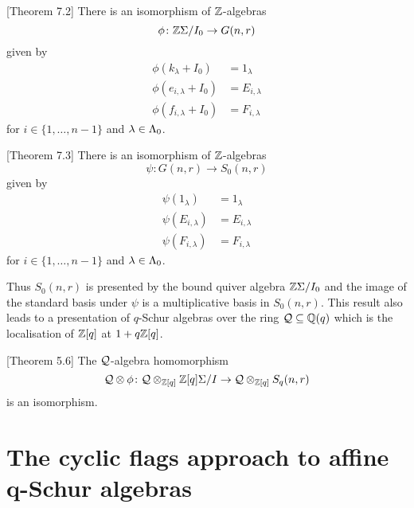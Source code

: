 \documentclass[a4paper, 11pt, twoside]{report}
\begin{document}
\begin{theorem*}\cite{su15}[Theorem 7.2]
There is an isomorphism of $\mathbb{Z}$-algebras
\begin{equation*}
\phi\colon\mathbb{Z}\Sigma/{I_0}\to G(n,r)
\end{equation*}
given by
\begin{align*}
\phi(k_\lambda + I_0) &= 1_\lambda\\
\phi(e_{i,\lambda} + I_0) &= E_{i,\lambda}\\
\phi(f_{i,\lambda} + I_0) &= F_{i,\lambda}
\end{align*}
for $i\in\{1,\ldots,n-1\}$ and $\lambda\in\Lambda_0{}$.
\end{theorem*}

\begin{theorem*}\cite{su15}[Theorem 7.3]
There is an isomorphism of $\mathbb{Z}$-algebras
\begin{equation*}
\psi\colon G(n,r)\to S_0(n,r)
\end{equation*}
given by
\begin{align*}
\psi(1_\lambda) &= 1_\lambda\\
\psi(E_{i,\lambda}) &= E_{i,\lambda}\\
\psi(F_{i,\lambda}) &= F_{i,\lambda}
\end{align*}
for $i\in\{1,\ldots,n-1\}$ and $\lambda\in\Lambda_0{}$.
\end{theorem*}

Thus $S_0(n,r)$ is presented by the bound quiver algebra $\mathbb{Z}\Sigma/{I_0}$ and the image of the standard basis under $\psi$ is a multiplicative basis in $S_0(n,r)$. This result also leads to a presentation of $q$-Schur algebras over the ring $\mathcal{Q}\subseteq\mathbb{Q}(q)$ which is the localisation of $\mathbb{Z}[q]$ at $1+q\mathbb{Z}[q]$.

\begin{theorem*}\cite{su15}[Theorem 5.6]
The $\mathcal{Q}$-algebra homomorphism
\begin{equation*}
\mathcal{Q}\otimes\phi\colon \mathcal{Q}\otimes_{\mathbb{Z}[q]}\mathbb{Z}[q]\Sigma/{I} \to\mathcal{Q}\otimes_{\mathbb{Z}[q]} S_q(n,r)
\end{equation*}
is an isomorphism.
\end{theorem*}


\section{The cyclic flags approach to affine q-Schur algebras}
\end{document}
